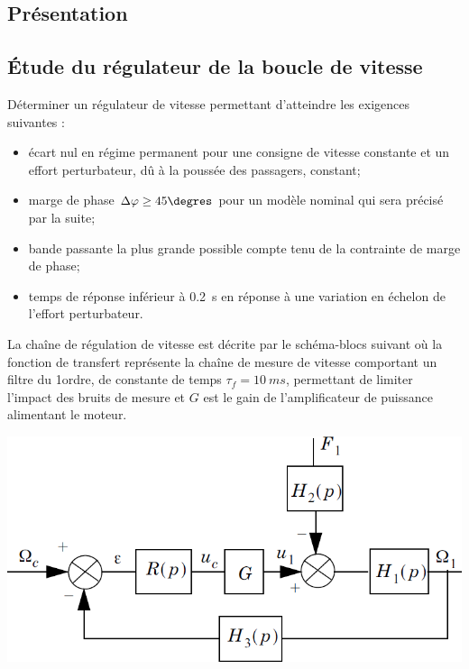 \documentclass[10pt,fleqn]{article} %
\begin{document}

\vspace{5cm}
\pagestyle{fancy}
\thispagestyle{plain}

\def\columnseprulecolor{\color{ocre}}
\setlength{\columnseprule}{0.4pt} 

\def\pathfig{images}

\begin{multicols}{2}

\subsection*{Présentation}


\subsection*{Étude du régulateur de la boucle de vitesse}

\begin{obj}Déterminer un régulateur de vitesse permettant d’atteindre les exigences
suivantes :
\begin{itemize}
\item écart nul en régime permanent pour une consigne de vitesse constante et un effort perturbateur, dû à la poussée des passagers, constant;
\item marge de phase $\Delta \varphi \geq 45\degres$ pour un modèle nominal qui sera précisé par la suite;
\item bande passante la plus grande possible compte tenu de la contrainte de marge de phase;
\item temps de réponse inférieur à \SI{0,2}{s} en réponse à une variation en échelon de l’effort perturbateur.
\end{itemize}
\end{obj}

La chaîne de régulation de vitesse est décrite par le schéma-blocs suivant où la fonction de transfert représente la chaîne de mesure de vitesse comportant un filtre
du 1\ier ordre, de constante de temps $\tau_f = \SI{10}{ms}$, permettant de limiter
l’impact des bruits de mesure et $G$ est le gain de l’amplificateur de puissance
alimentant le moteur.

\begin{center}
\includegraphics[width=\linewidth]{images/fig_01}
\end{center}


\end{multicols}
\end{document}
